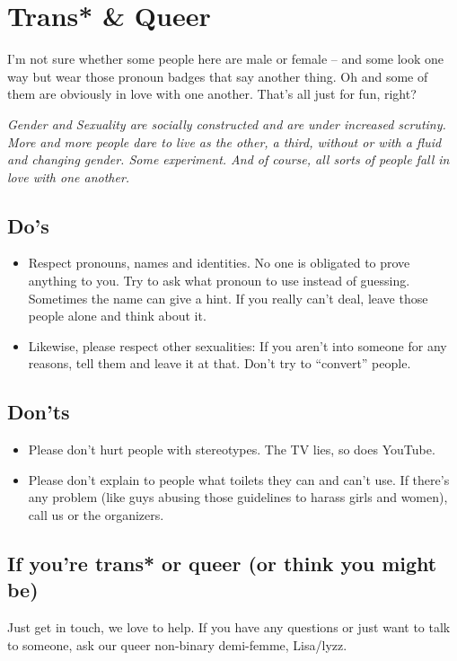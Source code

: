 \documentclass[10pt]{leaflet}
\begin{document}
\section{Trans* \& Queer}
\label{sec-5}
I'm not sure whether some people here are male or female -- and some
look one way but wear those pronoun badges that say another thing. Oh
and some of them are obviously in love with one another. That's all
just for fun, right?

\emph{Gender and Sexuality are socially constructed and are under
  increased scrutiny. More and more people dare to live as the
  other, a third, without or with a fluid and changing gender. Some
  experiment. And of course, all sorts of people fall in love with one
  another.}
\subsection{Do's}
\label{sec-5-1}
\begin{itemize}
\item Respect pronouns, names and identities. No one is obligated to
  prove anything to you. Try to ask what pronoun to use instead of
  guessing. Sometimes the name can give a hint. If you really can't
  deal, leave those people alone and think about it.
\item Likewise, please respect other sexualities: If you aren't into
  someone for any reasons, tell them and leave it at that. Don't try
  to ``convert'' people.
\end{itemize}
\subsection{Don'ts}
\label{sec-5-2}
\begin{itemize}
\item Please don't hurt people with stereotypes. The TV lies, so does
  YouTube.
\item Please don't explain to people what toilets they can and can't
  use. If there's any problem (like guys abusing those guidelines to
  harass girls and women), call us or the organizers.
\end{itemize}
\subsection{If you're trans* or queer (or think you might be)}
Just get in touch, we love to help. If you have any questions or just
want to talk to someone, ask our queer non-binary demi-femme, Lisa/lyzz.
\clearpage
\end{document}
